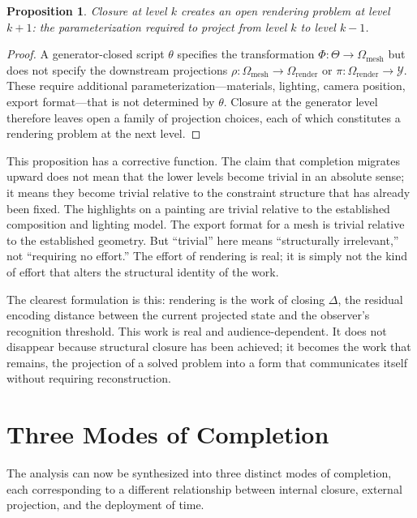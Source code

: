 \documentclass[11pt, twoside]{article}
\theoremstyle{plain}
\newtheorem{proposition}[theorem]{Proposition}
\theoremstyle{definition}
\theoremstyle{remark}
\begin{document}
\begin{proposition}
\label{prop:relocation}
Closure at level $k$ creates an open rendering problem at level $k+1$: the parameterization required to project from level $k$ to level $k-1$.
\end{proposition}

\begin{proof}
A generator-closed script $\theta$ specifies the transformation $\Phi : \Theta \to \Omega_{\text{mesh}}$ but does not specify the downstream projections $\rho : \Omega_{\text{mesh}} \to \Omega_{\text{render}}$ or $\pi : \Omega_{\text{render}} \to \mathcal{Y}$. These require additional parameterization---materials, lighting, camera position, export format---that is not determined by $\theta$. Closure at the generator level therefore leaves open a family of projection choices, each of which constitutes a rendering problem at the next level.
\end{proof}

This proposition has a corrective function. The claim that completion migrates upward does not mean that the lower levels become trivial in an absolute sense; it means they become trivial relative to the constraint structure that has already been fixed. The highlights on a painting are trivial relative to the established composition and lighting model. The export format for a mesh is trivial relative to the established geometry. But ``trivial'' here means ``structurally irrelevant,'' not ``requiring no effort.'' The effort of rendering is real; it is simply not the kind of effort that alters the structural identity of the work.

The clearest formulation is this: rendering is the work of closing $\Delta$, the residual encoding distance between the current projected state and the observer's recognition threshold. This work is real and audience-dependent. It does not disappear because structural closure has been achieved; it becomes the work that remains, the projection of a solved problem into a form that communicates itself without requiring reconstruction.

\section{Three Modes of Completion}
\label{sec:three-modes}

The analysis can now be synthesized into three distinct modes of completion, each corresponding to a different relationship between internal closure, external projection, and the deployment of time.
\end{document}
